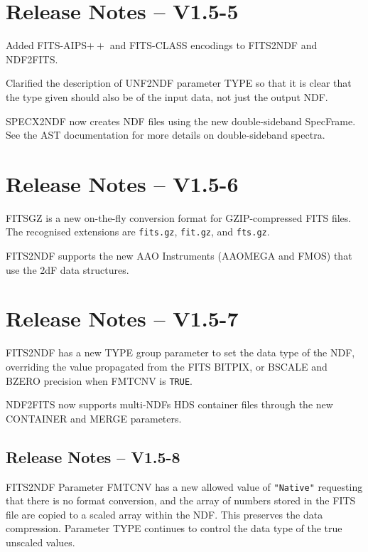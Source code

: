 \documentclass[twoside,11pt]{article}
\newcommand{\htmlref}[2]{#1}
\begin{document}
\section{Release Notes -- V1.5-5}

Added FITS-AIPS$++$ and FITS-CLASS encodings to 
\htmlref{FITS2NDF}{FITS2NDF} and \htmlref{NDF2FITS}{NDF2FITS}.

Clarified the description of \htmlref{UNF2NDF}{UNF2NDF} parameter TYPE
so that it is clear that the type given should also be of the input
data, not just the output NDF.

\htmlref{SPECX2NDF}{SPECX2NDF} now creates NDF files using the new
double-sideband SpecFrame.  See the AST documentation for more details
on double-sideband spectra.

\section{Release Notes -- V1.5-6}

FITSGZ is a new on-the-fly conversion format for GZIP-compressed FITS
files.  The recognised extensions are \texttt{fits.gz}, \texttt{fit.gz}, and
\texttt{fts.gz}.

FITS2NDF supports the new AAO Instruments (AAOMEGA and FMOS) that use
the 2dF data structures.
  
\section{Release Notes -- V1.5-7}

\htmlref{FITS2NDF}{FITS2NDF} has a new TYPE group parameter to set the
data type of the NDF, overriding the value propagated from the FITS
BITPIX, or BSCALE and BZERO precision when FMTCNV is \texttt{TRUE}.

\htmlref{NDF2FITS}{NDF2FITS} now supports multi-NDFs HDS container files
through the new CONTAINER and MERGE parameters.

\subsection{Release Notes -- V1.5-8}

\htmlref{FITS2NDF}{FITS2NDF} Parameter FMTCNV has a new allowed value
of \texttt{"Native"} requesting that there is no format conversion, and
the array of numbers stored in the FITS file are copied to a scaled array
within the NDF.  This preserves the data compression.  Parameter TYPE
continues to control the data type of the true unscaled values.
\end{document}
